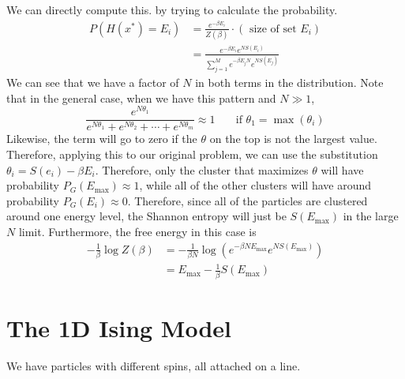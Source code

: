 \documentclass[11pt]{article}
\begin{document}
We can directly compute this. by trying to calculate the probability.
\begin{align*}
P(H(x^*) = E_i) 
&= \frac{e^{-\beta E_i}}{Z(\beta)} \cdot (\text{ size of set } E_i) \\
&= \frac{e^{-\beta E_i} e^{NS(E_i)}}{\sum_{j=1}^M e^{-\beta E_j N} e^{NS(E_j)}}
\end{align*}
We can see that we have a factor of $N$ in both terms in the distribution. Note that in the general case, when we have this pattern and $N \gg 1$, 
\begin{equation*}
	\frac{e^{N \theta_1}}{ e^{N \theta_1} + e^{N \theta_2} + \cdots + e^{N \theta_m} } \approx 1 ~ ~ ~ ~ ~ ~ ~ \text{ if } \theta_1 = \max(\theta_i)
\end{equation*}
Likewise, the term will go to zero if the $\theta$ on the top is not the largest value. Therefore, applying this to our original problem, we can use the substitution $\theta_i = S(e_i) - \beta E_i$. Therefore, only the cluster that maximizes $\theta$ will have probability $P_G(E_{\max}) \approx 1$, while all of the other clusters will have around probability $P_G(E_i) \approx 0$. 
Therefore, since all of the particles are clustered around one energy level, the Shannon entropy will just be $S(E_{\max})$ in the large $N$ limit. Furthermore, the free energy in this case is 
\begin{align*}
	- \frac{1}{\beta} \log Z(\beta)
	&= -\frac{1}{\beta N} \log\left( e^{-\beta N E_{\max}} e^{N S(E_{\max})} \right) \\
	&= E_{\max} - \frac{1}{\beta}S(E_{\max})
\end{align*}

















\section{The 1D Ising Model}
We have particles with different spins, all attached on a line.

\begin{center}
\end{center}
\end{document}
